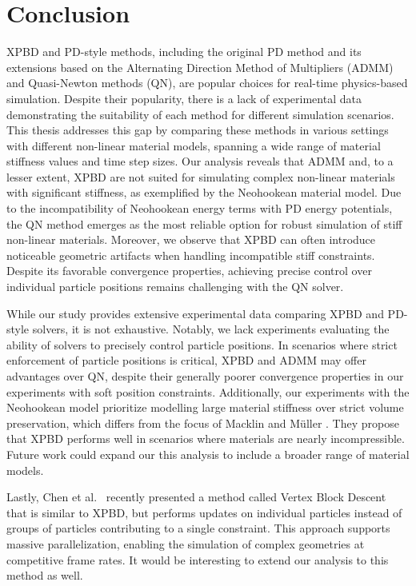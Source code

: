 \chapter{Conclusion}\label{ch:conclusion}
XPBD and PD-style methods, including the original PD method and its extensions based on the Alternating Direction Method of 
Multipliers (ADMM) and Quasi-Newton methods (QN), are popular choices for real-time physics-based simulation. Despite their 
popularity, there is a lack of experimental data demonstrating the suitability of each method for different simulation 
scenarios. This thesis addresses this gap by comparing these methods in various settings with different non-linear material 
models, spanning a wide range of material stiffness values and time step sizes. Our analysis reveals that ADMM and, to a 
lesser extent, XPBD are not suited for simulating complex non-linear materials with significant stiffness, as exemplified 
by the Neohookean material model. Due to the incompatibility of Neohookean energy terms with PD energy potentials, the QN 
method emerges as the most reliable option for robust simulation of stiff non-linear materials. Moreover, we observe that 
XPBD can often introduce noticeable geometric artifacts when handling incompatible stiff constraints. Despite its favorable 
convergence properties, achieving precise control over individual particle positions remains challenging with the QN solver.

While our study provides extensive experimental data comparing XPBD and PD-style solvers, it is not exhaustive. Notably, 
we lack experiments evaluating the ability of solvers to precisely control particle positions. In scenarios where strict 
enforcement of particle positions is critical, XPBD and ADMM may offer advantages over QN, despite their generally poorer 
convergence properties in our experiments with soft position constraints. Additionally, our experiments with the Neohookean 
model prioritize modelling large material stiffness over strict volume preservation, which differs from the focus of 
Macklin and Müller \cite{macklin2021}. They propose that XPBD performs well in scenarios where materials are nearly 
incompressible. Future work could expand our this analysis to include a broader range of material models.

Lastly, Chen et al.\ \cite{chen2024} recently presented a method called Vertex Block Descent that is similar to XPBD, but 
performs updates on individual particles instead of groups of particles contributing to a single constraint. This approach
supports massive parallelization, enabling the simulation of complex geometries at competitive frame rates. It would 
be interesting to extend our analysis to this method as well.

